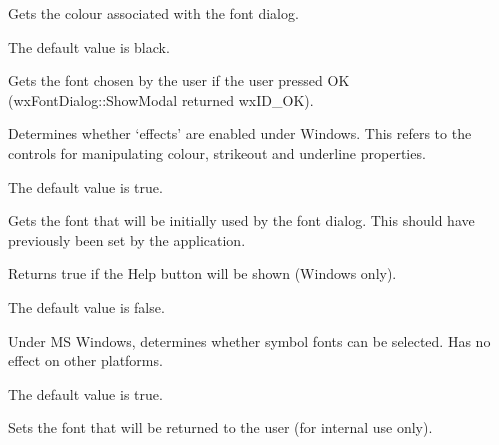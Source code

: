 
Gets the colour associated with the font dialog.

The default value is black.

\label{wxfontdatagetchosenfont}


Gets the font chosen by the user if the user pressed OK (wxFontDialog::ShowModal returned wxID\_OK).

\label{wxfontdatagetenableeffects}


Determines whether `effects' are enabled under Windows. This refers to the
controls for manipulating colour, strikeout and underline properties.

The default value is true.

\label{wxfontdatagetinitialfont}


Gets the font that will be initially used by the font dialog. This should have
previously been set by the application.

\label{wxfontdatagetshowhelp}


Returns true if the Help button will be shown (Windows only).

The default value is false.

\label{wxfontdatasetallowsymbols}


Under MS Windows, determines whether symbol fonts can be selected. Has no
effect on other platforms.

The default value is true.

\label{wxfontdatasetchosenfont}


Sets the font that will be returned to the user (for internal use only).

\label{wxfontdatasetcolour}


